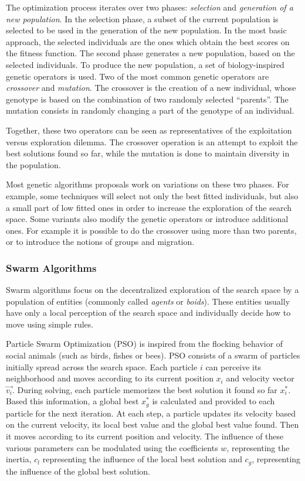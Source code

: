 The optimization process iterates over two phases: \emph{selection} and \emph{generation of a new population}.
In the selection phase, a subset of the current population is selected to be used in the generation of the new population. In the most basic approach, the selected individuals are the ones which obtain the best scores on the fitness function.
The second phase generates a new population, based on the selected individuals. To produce the new population, a set of biology-inspired genetic operators is used. Two of the most common genetic operators are \emph{crossover} and \emph{mutation}. The crossover is the creation of a new individual, whose genotype is based on the combination  of two randomly selected \enquote{parents}. The mutation consists in randomly changing a part of the genotype of an individual.

Together, these two operators can be seen as representatives of the exploitation versus exploration dilemma. The crossover operation is an attempt to exploit the best solutions found so far, while the mutation is done to maintain diversity in the population. 

Most genetic algorithms proposals work on variations on these two phases. For example, some techniques will select not only the best fitted individuals, but also a small part of low fitted ones in order to increase the exploration of the search space. Some variants also modify the genetic operators or introduce additional ones. For example it is possible to do the crossover using more than two parents, or to introduce the notions of groups and migration.

\subsubsection{Swarm Algorithms}

Swarm algorithms focus on the decentralized exploration of the search space by a population of entities (commonly called \emph{agents} or \emph{boids}). These entities usually have only a local perception of the search space and individually decide how to move using simple rules.

Particle Swarm Optimization (PSO) \cite{kennedy1995particle} is inspired from the flocking behavior of social animals (such as birds, fishes or bees). PSO consists of a swarm of particles initially spread across the search space. Each particle $i$ can perceive its neighborhood and moves according to its current position $x_i$ and velocity vector $\overrightarrow{v_i}$.
During solving, each particle memorizes the best solution it found so far $x_i^*$. Based this information, a global best $x_g^*$ is calculated and provided to each particle for the next iteration.
At each step, a particle updates its velocity based on the current velocity, its local best value and the global best value found. Then it moves according to its current position and velocity. The influence of these various parameters can be modulated using the coefficients $w$, representing the inertia, $c_l$ representing the influence of the local best solution and $c_g$, representing the influence of the global best solution.

